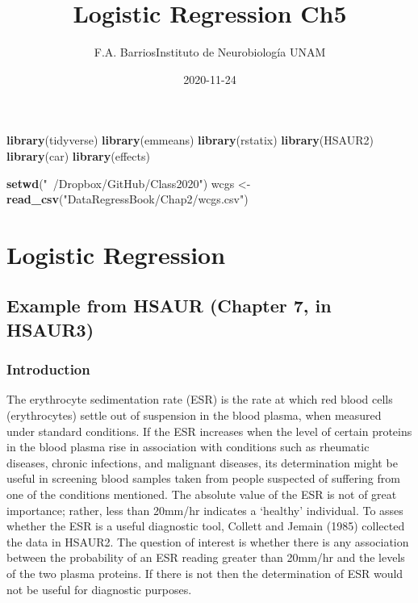 \documentclass[
]{article}
\title{Logistic Regression Ch5}
\author{F.A. BarriosInstituto de Neurobiología UNAM}
\date{2020-11-24}
\newenvironment{Shaded}{\begin{snugshade}}{\end{snugshade}}
\newcommand{\KeywordTok}[1]{\textcolor[rgb]{0.13,0.29,0.53}{\textbf{#1}}}
\newcommand{\NormalTok}[1]{#1}
\newcommand{\StringTok}[1]{\textcolor[rgb]{0.31,0.60,0.02}{#1}}
\begin{document}
\maketitle

\begin{Shaded}
\begin{Highlighting}[]
\KeywordTok{library}\NormalTok{(tidyverse)}
\KeywordTok{library}\NormalTok{(emmeans)}
\KeywordTok{library}\NormalTok{(rstatix)}
\KeywordTok{library}\NormalTok{(HSAUR2)}
\KeywordTok{library}\NormalTok{(car)}
\KeywordTok{library}\NormalTok{(effects)}

\KeywordTok{setwd}\NormalTok{(}\StringTok{"~/Dropbox/GitHub/Class2020"}\NormalTok{)}
\NormalTok{wcgs <-}\StringTok{ }\KeywordTok{read_csv}\NormalTok{(}\StringTok{"DataRegressBook/Chap2/wcgs.csv"}\NormalTok{)}
\end{Highlighting}
\end{Shaded}

\hypertarget{logistic-regression}{%
\section{Logistic Regression}\label{logistic-regression}}

\hypertarget{example-from-hsaur-chapter-7-in-hsaur3}{%
\subsection{Example from HSAUR (Chapter 7, in
HSAUR3)}\label{example-from-hsaur-chapter-7-in-hsaur3}}

\hypertarget{introduction}{%
\subsubsection{Introduction}\label{introduction}}

The erythrocyte sedimentation rate (ESR) is the rate at which red blood
cells (erythrocytes) settle out of suspension in the blood plasma, when
measured under standard conditions. If the ESR increases when the level
of certain proteins in the blood plasma rise in association with
conditions such as rheumatic diseases, chronic infections, and malignant
diseases, its determination might be useful in screening blood samples
taken from people suspected of suffering from one of the conditions
mentioned. The absolute value of the ESR is not of great importance;
rather, less than 20mm/hr indicates a `healthy' individual. To asses
whether the ESR is a useful diagnostic tool, Collett and Jemain (1985)
collected the data in HSAUR2. The question of interest is whether there
is any association between the probability of an ESR reading greater
than 20mm/hr and the levels of the two plasma proteins. If there is not
then the determination of ESR would not be useful for diagnostic
purposes.
\end{document}

